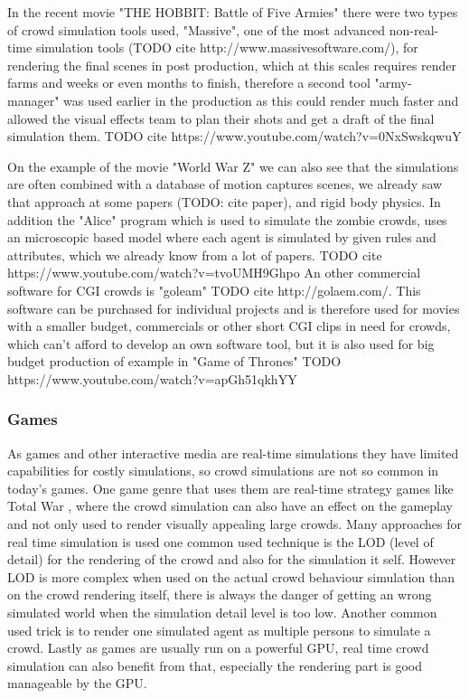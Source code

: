 \documentclass[sigconf]{acmart}
\begin{document}
In the recent movie "THE HOBBIT: Battle of Five Armies" there were  two types of crowd simulation tools used, "Massive", one of the most advanced non-real-time simulation tools (TODO cite http://www.massivesoftware.com/), for rendering the final scenes in post production, which at this scales requires render farms and weeks or even months to finish, therefore a second tool "army-manager" was used earlier in the production as this could render much faster and allowed the visual effects team to plan their shots and get a draft of the final simulation them. TODO cite https://www.youtube.com/watch?v=0NxSwskqwuY

On the example of the movie "World War Z" we can also see that the simulations are often combined with a database of motion captures scenes, we already saw that approach at some papers (TODO: cite paper), and rigid body physics. In addition the "Alice" program which is used to simulate the zombie crowds, uses an microscopic based model where each agent is simulated by given rules and attributes, which we already know from a lot of papers. TODO cite https://www.youtube.com/watch?v=tvoUMH9Ghpo
\cite{thalmann_crowd_2013}
An other commercial software for CGI crowds is "goleam" TODO cite http://golaem.com/. This software can be purchased for individual projects and is therefore used for movies with a smaller budget, commercials or other short CGI clips in need for crowds, which can't afford to develop an own software tool, but it is also used for big budget production of example in "Game of Thrones" TODO https://www.youtube.com/watch?v=apGh51qkhYY

\subsubsection{Games}

As games and other interactive media are real-time simulations they have limited capabilities for costly simulations, so crowd simulations are not so common in today's games. One game genre that uses them are real-time strategy games like Total War \cite{total_war_website}, where the crowd simulation can also have an effect on the gameplay and not only used to render visually appealing large crowds. 
Many approaches for real time simulation is used one common used technique is the LOD (level of detail) for the rendering of the crowd and also for the simulation it self. However LOD is more complex when used on the actual crowd behaviour simulation than on the crowd rendering itself, there is always the danger of getting an wrong simulated world when the simulation detail level is too low. Another common used trick is to render one simulated agent as multiple persons to simulate a crowd. Lastly as games are usually run on a powerful GPU, real time crowd simulation can also benefit from that, especially the rendering part is good manageable by the GPU. 
\end{document}
